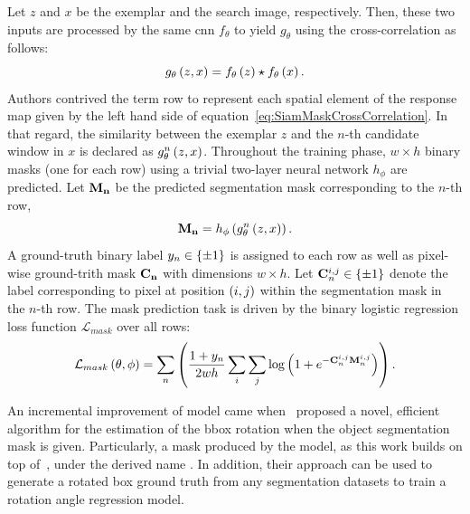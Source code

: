 Let $z$ and $x$ be the exemplar and the search image, respectively. Then, these two inputs are processed by the same \gls{cnn} $f_\theta$ to yield $g_\theta$ using the cross-correlation as follows:
\begin{equation}
    \label{eq:SiamMaskCrossCorrelation}
    {g_\theta} \left( z, x \right) = {f_\theta} \left( z \right) \star {f_\theta} \left( x \right).
\end{equation}
Authors contrived the term \gls{row} to represent each spatial element of the response map given by the left hand side of equation~\ref{eq:SiamMaskCrossCorrelation}. In that regard, the similarity between the exemplar $z$ and the $n$-th candidate window in $x$ is declared as ${{g}_{\theta}^{n}} \left( z, x \right)$. Throughout the training phase, $w \times h$ binary masks (one for each \gls{row}) using a trivial two-layer neural network $h_\phi$ are predicted. Let $\mathbf{M_n}$ be the predicted segmentation mask corresponding to the $n$-th \gls{row},
\begin{equation}
    \mathbf{M_n} = {h_\phi} \left( {{g}_{\theta}^{n}} \left( z, x \right) \right).
\end{equation}
A ground-truth binary label $y_n \in \left\{ {\pm 1} \right\}$ is assigned to each \gls{row} as well as pixel-wise ground-trith mask $\mathbf{C_n}$ with dimensions $w \times h$. Let $\mathbf{C}_n^{i,j} \in \left\{ {\pm 1} \right\}$ denote the label corresponding to pixel at position $\left( {i, j} \right)$ within the segmentation mask in the $n$-th \gls{row}. The mask prediction task is driven by the binary logistic regression loss function $\mathcal{L}_{mask}$ over all \glspl{row}:
\begin{equation}
    {\mathcal{L}_{mask}} \left( \theta, \phi \right) =
    \sum_n
    \left( {
    \frac{1 + y_n}{2wh}
    \sum_{i}
    \sum_{j}
    {\log} \left( 1 + e^{-\mathbf{C}_n^{i,j} \mathbf{M}_n^{i,j}} \right)
    } \right).
\end{equation}

An incremental improvement of  model came when~\cite{chen2019rotbboxes} proposed a novel, efficient algorithm for the estimation of the \gls{bbox} rotation when the object segmentation mask is given. Particularly, a mask produced by the  model, as this work builds on top of~\cite{wang2019siammask}, under the derived name . In addition, their approach can be used to generate a rotated box ground truth from any segmentation datasets to train a rotation angle regression model.

